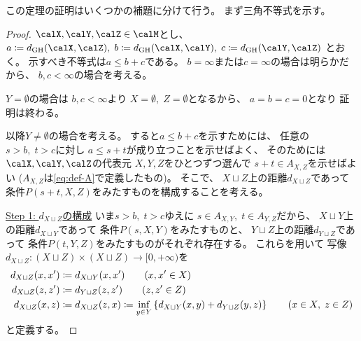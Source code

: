 \documentclass[report, notitlepage]{jlreq}
\newcommand{\GH}{\mathrm{GH}}
\begin{document}
この定理の証明はいくつかの補題に分けて行う。
まず三角不等式を示す。


\begin{proof}
    $\calX, \calY, \calZ \in \calM$とし、
    $a \coloneqq d_\GH(\calX, \calZ), \;
        b \coloneqq d_\GH(\calX, \calY), \;
        c \coloneqq d_\GH(\calY, \calZ)$
    とおく。
    示すべき不等式は$a \le b + c$である。
    $b = \infty$または$c = \infty$の場合は明らかだから、
    $b, c < \infty$の場合を考える。

    $Y = \emptyset$の場合は
    $b, c < \infty$より
    $X = \emptyset, \; Z = \emptyset$となるから、
    $a = b = c = 0$となり
    証明は終わる。

    以降$Y \neq \emptyset$の場合を考える。
    すると$a \le b + c$を示すためには、
    任意の$s > b, \; t > c$に対し
    $a \le s + t$が成り立つことを示せばよく、
    そのためには
    $\calX, \calY, \calZ$の代表元
    $X, Y, Z$をひとつずつ選んで
    $s + t \in A_{X, Z}$を示せばよい
    ($A_{X, Z}$は\cref{eq:def-A}で定義したもの)。
    そこで、
    $X \sqcup Z$上の距離$d_{X \sqcup Z}$であって
    条件$P(s + t, X, Z)$をみたすものを構成することを考える。

    \uline{Step 1: $d_{X \sqcup Z}$の構成} \quad
    いま$s > b, \; t > c$ゆえに
    $s \in A_{X, Y}, \; t \in A_{Y, Z}$だから、
    $X \sqcup Y$上の距離$d_{X \sqcup Y}$であって
    条件$P(s, X, Y)$をみたすものと、
    $Y \sqcup Z$上の距離$d_{Y \sqcup Z}$であって
    条件$P(t, Y, Z)$をみたすものがそれぞれ存在する。
    これらを用いて
    写像$d_{X \sqcup Z} \colon (X \sqcup Z) \times (X \sqcup Z) \to [0, +\infty)$を
    \begin{alignat}{1}
        d_{X \sqcup Z}(x, x')
            &\coloneqq
                d_{X \sqcup Y}(x, x')
                \qquad
                (x, x' \in X)
                \\
        d_{X \sqcup Z}(z, z')
            &\coloneqq
                d_{Y \sqcup Z}(z, z')
                \qquad
                (z, z' \in Z)
                \\
        d_{X \sqcup Z}(x, z)
            &\coloneqq
                d_{X \sqcup Z}(z, x)
                \coloneqq
                \inf_{y \in Y} \left\{{
                    d_{X \sqcup Y}(x, y) + d_{Y \sqcup Z}(y, z)
                }\right\}
                \qquad
                (x \in X, \; z \in Z)
    \end{alignat}
    と定義する。


\end{proof}
\end{document}
